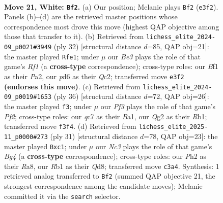 \documentclass[11pt]{article}
\begin{document}
\begin{figure}[p]
\label{fig:thought-m38}
\end{figure}

\clearpage

\begin{figure}[p]\centering
\begin{subfigure}{0.46\textwidth}\centering
\resizebox{\linewidth}{!}{%
\newchessgame
\chessboard[
  setfen={rn5r/1pqb1kbp/p2pp1p1/4p1Pn/4P3/2N1BP2/PPPK2QP/1R2RB2 w - - 2 21},
  showmover=false,
  pgfstyle=straightmove, color=movearrow, markmove={e3-f2}
]}
\caption{}
\end{subfigure}\hfill
\begin{subfigure}{0.46\textwidth}\centering
\resizebox{\linewidth}{!}{%
\newchessgame
\chessboard[
  setfen={r1bqrnk1/pp2bppp/2pp2n1/8/1PPP4/3B1NNP/P1QB1PP1/R4RK1 w - - 3 17},
  showmover=false,
  pgfstyle=straightmove, color=movearrow, markmove={f1-e1}
]}
\caption{}
\end{subfigure}
\\[4pt]
\begin{subfigure}{0.46\textwidth}\centering
\resizebox{\linewidth}{!}{%
\newchessgame
\chessboard[
  setfen={r1b2rk1/2q1ppbp/3p1np1/2pP4/n1P5/1N2P3/4BPPP/BR1QNRK1 w - - 2 19},
  showmover=false,
  pgfstyle=straightmove, color=movearrow, markmove={f2-f3}
]}
\caption{}
\end{subfigure}\hfill
\begin{subfigure}{0.46\textwidth}\centering
\resizebox{\linewidth}{!}{%
\newchessgame
\chessboard[
  setfen={r1bq1rk1/1p3ppp/2pn4/p2p2b1/P2P4/2P2N1P/1P3PP1/R1BQRBK1 b - - 2 16},
  showmover=false,
  pgfstyle=straightmove, color=movearrow, markmove={g5-c1}
]}
\caption{}
\end{subfigure}
\caption{\textbf{Move 21, White: \texttt{Bf2}.} (a) Our position; Melanie plays \texttt{Bf2} (\texttt{e3f2}). Panels (b)--(d) are the retrieved master positions whose correspondence most drove this move (highest QAP objective among those that transfer to it). (b) Retrieved from \texttt{lichess\_elite\_2024-09\_p0021\#3949} (ply 32) [structural distance $d$=85, QAP obj=21]: the master played \texttt{Rfe1}; under $\mu$ our \emph{Be3} plays the role of that game's \emph{Rf1} (a \textbf{cross-type} correspondence); cross-type roles: our \emph{B}f1 as their \emph{P}a2, our \emph{p}d6 as their \emph{Q}c2; transferred move \texttt{e3f2} \textbf{(endorses this move)}. (c) Retrieved from \texttt{lichess\_elite\_2024-09\_p0019\#1653} (ply 36) [structural distance $d$=72, QAP obj=26]: the master played \texttt{f3}; under $\mu$ our \emph{Pf3} plays the role of that game's \emph{Pf2}; cross-type roles: our \emph{q}c7 as their \emph{B}a1, our \emph{Q}g2 as their \emph{R}b1; transferred move \texttt{f3f4}. (d) Retrieved from \texttt{lichess\_elite\_2025-11\_p0000\#273} (ply 31) [structural distance $d$=78, QAP obj=23]: the master played \texttt{Bxc1}; under $\mu$ our \emph{Nc3} plays the role of that game's \emph{Bg4} (a \textbf{cross-type} correspondence); cross-type roles: our \emph{P}h2 as their \emph{R}a8, our \emph{R}b1 as their \emph{Q}d8; transferred move \texttt{c3a4}. Synthesis: 1 retrieved analog transferred to \texttt{Bf2} (summed QAP objective 21, the strongest correspondence among the candidate moves); Melanie committed it via the \texttt{search} selector.}

\end{figure}
\end{document}
